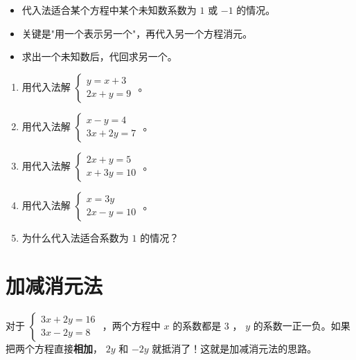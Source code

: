 \begin{keytakeaway}


\begin{itemize}
  \item 代入法适合某个方程中某个未知数系数为 $1$ 或 $-1$ 的情况。
  \item 关键是"用一个表示另一个"，再代入另一个方程消元。
  \item 求出一个未知数后，代回求另一个。
\end{itemize}


\end{keytakeaway}

\begin{practice}


\begin{enumerate}
  \item 用代入法解 $\begin{cases} y = x + 3 \\ 2x + y = 9 \end{cases}$ 。
  \item 用代入法解 $\begin{cases} x - y = 4 \\ 3x + 2y = 7 \end{cases}$ 。
  \item 用代入法解 $\begin{cases} 2x + y = 5 \\ x + 3y = 10 \end{cases}$ 。
  \item 用代入法解 $\begin{cases} x = 3y \\ 2x - y = 10 \end{cases}$ 。
  \item 为什么代入法适合系数为 $1$ 的情况？
\end{enumerate}


\end{practice}

\section*{加减消元法}


\begin{explore}


对于 $\begin{cases} 3x + 2y = 16 \\ 3x - 2y = 8 \end{cases}$ ，两个方程中 $x$ 的系数都是 $3$ ， $y$ 的系数一正一负。如果把两个方程直接\textbf{相加}， $2y$ 和 $-2y$ 就抵消了！这就是加减消元法的思路。

\end{explore}

